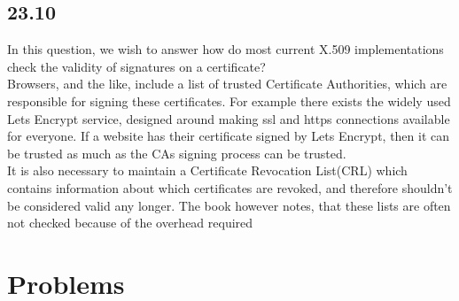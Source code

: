 \documentclass{article}
\begin{document}
\subsection{23.10}
In this question, we wish to answer how do most current X.509 implementations check the validity of signatures on a certificate?\\

Browsers, and the like, include a list of trusted Certificate Authorities, which are
responsible for signing these certificates. For example there exists the widely
used Lets Encrypt service, designed around making ssl and https connections available
for everyone. If a website has their certificate signed by Lets Encrypt, then it
can be trusted as much as the CAs signing process can be trusted.\\
It is also necessary to maintain a Certificate Revocation List(CRL) which contains
information about which certificates are revoked, and therefore shouldn't be
considered valid any longer. The book however notes, that these lists are often not
checked because of the overhead required


\section{Problems}
\end{document}
